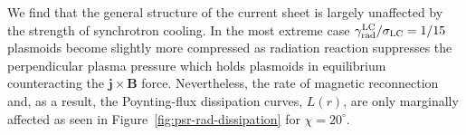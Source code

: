 \begin{figure}[htb]
\end{figure}

We find that the general structure of the current sheet is largely unaffected by the strength of synchrotron cooling. In the most extreme case $\gamma_{\rm rad}^{\rm LC}/\sigma_{\rm LC}=1/15$ plasmoids become slightly more compressed as radiation reaction suppresses the perpendicular plasma pressure which holds plasmoids in equilibrium counteracting the $\bm{j}\times\bm{B}$ force. Nevertheless, the rate of magnetic reconnection and, as a result, the Poynting-flux dissipation curves, $L(r)$, are only marginally affected as seen in Figure~\ref{fig:psr-rad-dissipation} for $\chi=20^\circ$. 

